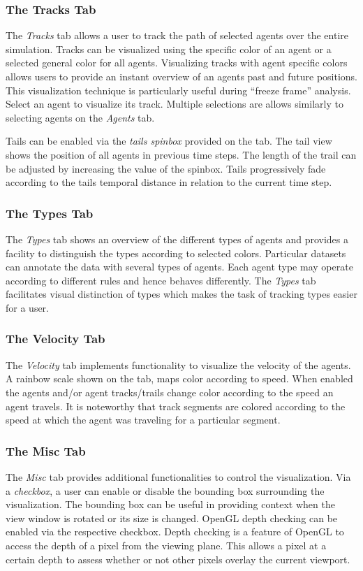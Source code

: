 \documentclass{article}
\begin{document}
\subsubsection{The Tracks Tab}
The \textit{Tracks} tab allows a user to track the path of selected agents over the entire simulation. Tracks can be visualized using the specific color of an agent or a selected general color for all agents. Visualizing tracks with agent specific colors allows users to provide an instant overview of an agents past and future positions. This visualization technique is particularly useful during ``freeze frame'' analysis. Select an agent to visualize its track. Multiple selections are allows similarly to selecting agents on the \textit{Agents} tab.

Tails can be enabled via the \textit{tails spinbox} provided on the tab. The tail view shows the position of all agents in previous time steps. The length of the trail can be adjusted by increasing the value of the spinbox. Tails progressively fade according to the tails temporal distance in relation to the current time step. 

\subsubsection{The Types Tab}
The \textit{Types} tab shows an overview of the different types of agents and provides a facility to distinguish the types according to selected colors. Particular datasets can annotate the data with several types of agents. Each agent type may operate according to different rules and hence behaves differently. The \textit{Types} tab facilitates visual distinction of types which makes the task of tracking types easier for a user.

\subsubsection{The Velocity Tab}
The \textit{Velocity} tab implements functionality to visualize the velocity of the agents. A rainbow scale shown on the tab, maps color according to speed. When enabled the agents and/or agent tracks/trails change color according to the speed an agent travels. It is noteworthy that track segments are colored according to the speed at which the agent was traveling for a particular segment.

\subsubsection{The Misc Tab}
The \textit{Misc} tab provides additional functionalities to control the visualization. Via a \textit{checkbox}, a user can enable or disable the bounding box surrounding the visualization. The bounding box can be useful in providing context when the view window is rotated or its size is changed. OpenGL depth checking can be enabled via the respective checkbox. Depth checking is a feature of OpenGL to access the depth of a pixel from the viewing plane. This allows a pixel at a certain depth to assess whether or not other pixels overlay the current viewport.
\end{document}
